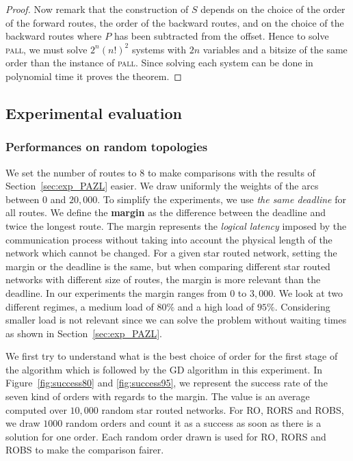 \documentclass[10pt, conference, letterpaper]{IEEEtran}
\newcommand\pall{\textsc{pall}\xspace}
\begin{document}
\begin{proof}
Now remark that the construction of $S$ depends on the choice of the order of the forward routes, the order of the backward routes, and on the choice of the backward routes where $P$ has been subtracted from the offset. Hence to solve \pall, we must solve $2^n(n!)^2$ systems with $2n$ variables and a bitsize of the same order than the instance of \pall. Since solving each system can be done in polynomial time it proves the theorem.
\end{proof}


    \subsection{Experimental evaluation}
    \label{sec:resultsPALL}
    \subsubsection{Performances on random topologies }
    
    We set the number of routes to $8$ to make comparisons with the results of Section~\ref{sec:exp_PAZL} easier. 
    We draw uniformly the weights of the arcs between $0$ and $20,000$. To simplify the experiments, 
    we use \emph{the same deadline} for all routes. We define the {\bf margin} as the difference between the deadline and twice the longest route. The margin represents the \emph{logical latency} imposed by the communication process without taking into account the physical length of the network which cannot be changed. For a given star routed network, setting the margin or the deadline is the same, but when comparing different star routed networks with different size of routes, the margin is more relevant than the deadline.
    In our experiments the margin ranges from  $0$ to $3,000$.
   We look at two different regimes, a medium load of $80\%$ and a high load of $95\%$.
   Considering smaller load is not relevant since we can solve the problem without waiting times as shown in Section~\ref{sec:exp_PAZL}. 
   
   We first try to understand what is the best choice of order for the first stage of the algorithm which is followed by the GD algorithm in this experiment. In Figure~\ref{fig:success80} and \ref{fig:success95}, we represent the success rate of the seven kind of orders with regards to the margin. The value is an average computed over $10,000$ random star routed networks. For RO, RORS and ROBS, we draw $1000$ random orders and count it as a success as soon as there is a solution for one order. Each random order drawn is used for RO, RORS and ROBS to make the comparison fairer.
   
\end{document}
